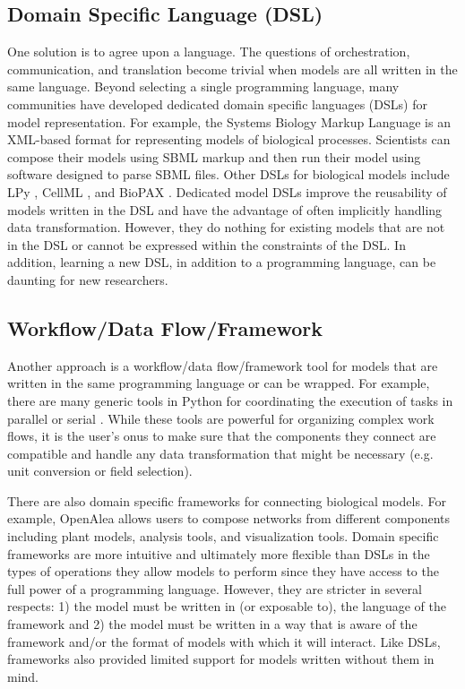 \documentclass[journal]{IEEEtran}
\begin{document}
\subsection{Domain Specific Language (DSL)}\label{SS:dsl}
%
One solution is to agree upon a language. The questions of orchestration, communication, and translation become trivial when models are all written in the same language. Beyond selecting a single programming language, many communities have  developed dedicated domain specific languages (DSLs) for model representation. For example, the Systems Biology Markup Language \citep[SBML][]{Hucka2003} is an XML-based format for representing models of biological processes. Scientists can compose their models using SBML markup and then run their model using software designed to parse SBML files. Other DSLs for biological models include LPy \citep{Boudon2012}, CellML \citep{Cuellar2003}, and BioPAX \citep{Demir2010}. Dedicated model DSLs improve the reusability of models written in the DSL and have the advantage of often implicitly handling data transformation. However, they do nothing for existing models that are not in the DSL or cannot be expressed within the constraints of the DSL. In addition, learning a new DSL, in addition to a programming language, can be daunting for new researchers.

\subsection{Workflow/Data Flow/Framework}\label{SS:framework}
%
Another approach is a workflow/data flow/framework tool for models that are written in the same programming language or can be wrapped. For example, there are many generic tools in Python for coordinating the execution of tasks in parallel or serial \citep[e.g.][]{babuji18, celery, luigi}. While these tools are powerful for organizing complex work flows, it is the user's onus to make sure that the components they connect are compatible and handle any data transformation that might be necessary (e.g. unit conversion or field selection).

There are also domain specific frameworks for connecting biological models. For example, OpenAlea \citep{Pradal2015} allows users to compose networks from different components including plant models, analysis tools, and visualization tools. Domain specific frameworks are more intuitive and ultimately more flexible than DSLs in the types of operations they allow models to perform since they have access to the full power of a programming language. However, they are stricter in several respects: 1) the model must be written in (or exposable to), the language of the framework and 2) the model must be written in a way that is aware of the framework and/or the format of models with which it will interact. Like DSLs, frameworks also provided limited support for models written without them in mind. 
\end{document}

